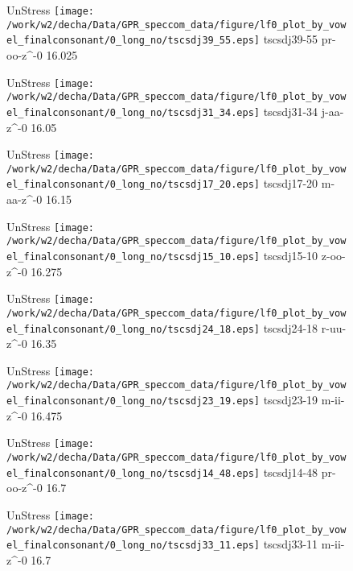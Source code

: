 \documentclass{article}
\begin{document}
\begin{figure}[t]
\begin{minipage}[b]{.24\textwidth}
UnStress
\centering
\texttt{[image: /work/w2/decha/Data/GPR\_speccom\_data/figure/lf0\_plot\_by\_vowel\_finalconsonant/0\_long\_no/tscsdj39\_55.eps]}
tscsdj39-55 pr-oo-z\textasciicircum-0 16.025
\end{minipage}
\begin{minipage}[b]{.24\textwidth}
UnStress
\centering
\texttt{[image: /work/w2/decha/Data/GPR\_speccom\_data/figure/lf0\_plot\_by\_vowel\_finalconsonant/0\_long\_no/tscsdj31\_34.eps]}
tscsdj31-34 j-aa-z\textasciicircum-0 16.05
\end{minipage}
\begin{minipage}[b]{.24\textwidth}
UnStress
\centering
\texttt{[image: /work/w2/decha/Data/GPR\_speccom\_data/figure/lf0\_plot\_by\_vowel\_finalconsonant/0\_long\_no/tscsdj17\_20.eps]}
tscsdj17-20 m-aa-z\textasciicircum-0 16.15
\end{minipage}
\begin{minipage}[b]{.24\textwidth}
UnStress
\centering
\texttt{[image: /work/w2/decha/Data/GPR\_speccom\_data/figure/lf0\_plot\_by\_vowel\_finalconsonant/0\_long\_no/tscsdj15\_10.eps]}
tscsdj15-10 z-oo-z\textasciicircum-0 16.275
\end{minipage}
\end{figure}
\clearpage
\begin{figure}[t]
\begin{minipage}[b]{.24\textwidth}
UnStress
\centering
\texttt{[image: /work/w2/decha/Data/GPR\_speccom\_data/figure/lf0\_plot\_by\_vowel\_finalconsonant/0\_long\_no/tscsdj24\_18.eps]}
tscsdj24-18 r-uu-z\textasciicircum-0 16.35
\end{minipage}
\begin{minipage}[b]{.24\textwidth}
UnStress
\centering
\texttt{[image: /work/w2/decha/Data/GPR\_speccom\_data/figure/lf0\_plot\_by\_vowel\_finalconsonant/0\_long\_no/tscsdj23\_19.eps]}
tscsdj23-19 m-ii-z\textasciicircum-0 16.475
\end{minipage}
\begin{minipage}[b]{.24\textwidth}
UnStress
\centering
\texttt{[image: /work/w2/decha/Data/GPR\_speccom\_data/figure/lf0\_plot\_by\_vowel\_finalconsonant/0\_long\_no/tscsdj14\_48.eps]}
tscsdj14-48 pr-oo-z\textasciicircum-0 16.7
\end{minipage}
\begin{minipage}[b]{.24\textwidth}
UnStress
\centering
\texttt{[image: /work/w2/decha/Data/GPR\_speccom\_data/figure/lf0\_plot\_by\_vowel\_finalconsonant/0\_long\_no/tscsdj33\_11.eps]}
tscsdj33-11 m-ii-z\textasciicircum-0 16.7
\end{minipage}
\end{figure}
\end{document}
